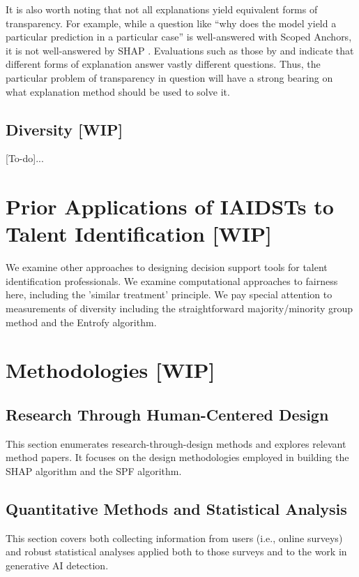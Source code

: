 It is also worth noting that not all explanations yield equivalent forms of transparency. For example, while a question like “why does the model yield a particular prediction in a particular case” is well-answered with Scoped Anchors, it is not well-answered by SHAP \cite{lundberg_unified_2017,ribeiro_anchors_2018}. Evaluations such as those by \textcite{binns_human_2022} and \textcite{rader_explanations_2018} indicate that different forms of explanation answer vastly different questions. Thus, the particular problem of transparency in question will have a strong bearing on what explanation method should be used to solve it.

\subsection{Diversity [WIP]}
[To-do]...

\section{Prior Applications of IAIDSTs to Talent Identification [WIP]}
We examine other approaches to designing decision support tools for talent identification professionals. We examine computational approaches to fairness here, including the 'similar treatment' principle. We pay special attention to measurements of diversity including the straightforward majority/minority group method and the Entrofy algorithm.

\section{Methodologies [WIP]}
\subsection{Research Through Human-Centered Design}
This section enumerates research-through-design methods and explores relevant method papers. It focuses on the design methodologies employed in building the SHAP algorithm and the SPF algorithm.

\subsection{Quantitative Methods and Statistical Analysis}
This section covers both collecting information from users (i.e., online surveys) and robust statistical analyses applied both to those surveys and to the work in generative AI detection.

